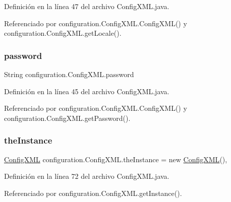Definición en la línea 47 del archivo Config\+X\+M\+L.\+java.



Referenciado por configuration.\+Config\+X\+M\+L.\+Config\+X\+M\+L() y configuration.\+Config\+X\+M\+L.\+get\+Locale().

\mbox{\label{classconfiguration_1_1ConfigXML_a719187d1ff6398218cb8f6d7b0f53763}} 
\subsubsection{\texorpdfstring{password}{password}}
{\footnotesize\ttfamily String configuration.\+Config\+X\+M\+L.\+password\hspace{0.3cm}{\ttfamily [private]}}



Definición en la línea 45 del archivo Config\+X\+M\+L.\+java.



Referenciado por configuration.\+Config\+X\+M\+L.\+Config\+X\+M\+L() y configuration.\+Config\+X\+M\+L.\+get\+Password().

\mbox{\label{classconfiguration_1_1ConfigXML_a7993e8ab35ee8854e832e85bafe85964}} 
\subsubsection{\texorpdfstring{theInstance}{theInstance}}
{\footnotesize\ttfamily \mbox{\hyperlink{classconfiguration_1_1ConfigXML}{Config\+X\+ML}} configuration.\+Config\+X\+M\+L.\+the\+Instance = new \mbox{\hyperlink{classconfiguration_1_1ConfigXML}{Config\+X\+ML}}()\hspace{0.3cm}{\ttfamily [static]}, {\ttfamily [private]}}



Definición en la línea 72 del archivo Config\+X\+M\+L.\+java.



Referenciado por configuration.\+Config\+X\+M\+L.\+get\+Instance().

\mbox{\label{classconfiguration_1_1ConfigXML_a79e9a3b8602620dbb873ba491f47164a}} 

